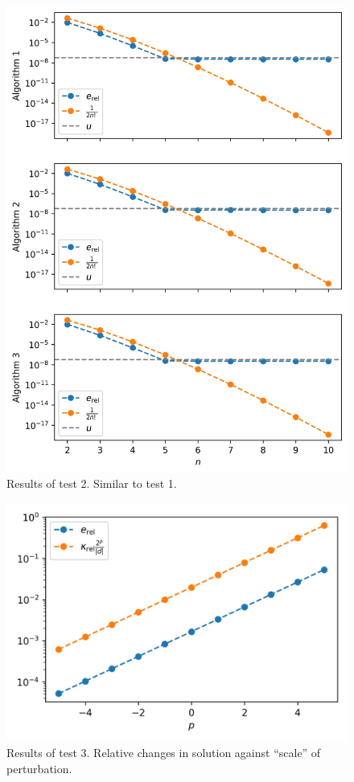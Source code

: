 \documentclass[12pt]{article}
\theoremstyle{definition}
\begin{document}
\begin{figure}[H]
\centering
\includegraphics{test2.jpeg}
\caption{Results of test 2. Similar to test 1.}
\label{test2}
\end{figure}

\begin{figure}[H]
\centering
\includegraphics{test3.jpeg}
\caption{Results of test 3. Relative changes in solution against ``scale'' of perturbation.}
\label{test3}
\end{figure}
\end{document}
